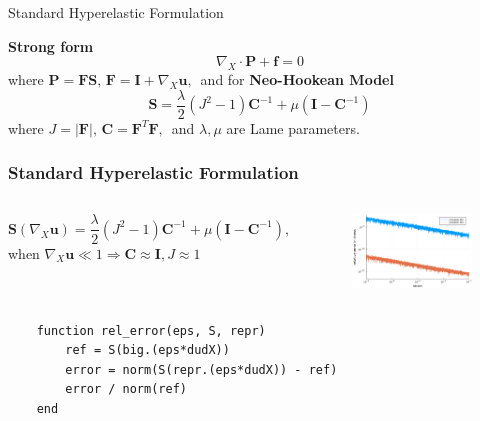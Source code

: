 \documentclass[aspectratio=169,xcolor=dvipsnames]{beamer}
\newcommand{\bm}{\boldsymbol}
\begin{document}
\begin{frame}{Standard Hyperelastic Formulation }

\textbf{Strong form}
{\Large
\begin{equation}
\nabla_X \cdot \bm{P} + \bm{f} = 0 \nonumber 
\end{equation}
}
where $\bm{P} = \bm{F} \bm{S}, \, \bm{F} = \bm{I} + \nabla_X \bm{u}, \, $ and for \textbf{Neo-Hookean Model}
{\Large
\begin{equation}
    \bm{S} = \frac{\lambda}{2} \left(J^2 - 1 \right) \bm{C}^{-1} + \mu \left(\bm{I} - \bm{C}^{-1} \right) \nonumber 
\end{equation}
}
where $J = \lvert \bm{F} \rvert, \, \bm{C} = \bm{F}^T \bm{F}, \,$ and $\lambda, \mu$ are Lame parameters.

\end{frame}


\begin{frame}[fragile]
\frametitle{Standard Hyperelastic Formulation}
    \begin{columns}[c] %
        \begin{equation}
            \bm{S}(\nabla_X \bm{u}) = \frac{\lambda}{2} \left(J^2 - 1 \right) \bm{C}^{-1} + \mu \left(\bm{I} - \bm{C}^{-1} \right), \nonumber
        \end{equation}
        when $\nabla_X \bm{u} \ll 1 \Longrightarrow \bm{C} \approx \bm{I}, J \approx 1$

        \begin{figure}
            \includegraphics[width=1.0\linewidth]{figures/unstable.png}
        \end{figure}
    \end{columns}
\vspace*{-20pt}
{\scriptsize
\begin{verbatim}
    function rel_error(eps, S, repr)
        ref = S(big.(eps*dudX)) 
        error = norm(S(repr.(eps*dudX)) - ref)
        error / norm(ref)
    end
\end{verbatim}
}      
\end{frame}
\end{document}
